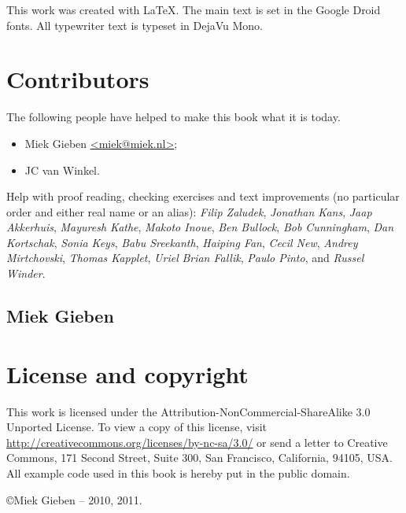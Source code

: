 \noindent{}This work was created with \LaTeX. The main text is set in
the Google Droid fonts. All typewriter text is typeset in DejaVu Mono.

\section{Contributors}
The following people have helped to make this book what it is today.
\begin{itemize}
\item{Miek Gieben \qquad\url{<miek@miek.nl>}};
\item{JC van Winkel}.
\end{itemize}

Help with proof reading, checking exercises and text improvements (no
particular order and either real name or an alias):
\emph{Filip Zaludek},
\emph{Jonathan Kans},
\emph{Jaap Akkerhuis},
\emph{Mayuresh Kathe},
\emph{Makoto Inoue},
\emph{Ben Bullock},
\emph{Bob Cunningham},
\emph{Dan Kortschak},
\emph{Sonia Keys},
\emph{Babu Sreekanth},
\emph{Haiping Fan},
\emph{Cecil New},
\emph{Andrey Mirtchovski},
\emph{Thomas Kapplet},
\emph{Uriel}
\emph{Brian Fallik},
\emph{Paulo Pinto},
and \emph{Russel Winder}.

\subsection{Miek Gieben}


\section{License and copyright}
This work is licensed under the Attribution-NonCommercial-ShareAlike 3.0 Unported License. To
view a copy of this license, visit \url{http://creativecommons.org/licenses/by-nc-sa/3.0/}
or send a letter to Creative Commons, 171 Second Street, Suite 300, San
Francisco, California, 94105, USA.\newline
All example code used in this book is hereby put in the public domain.

\copyright Miek Gieben -- 2010, 2011.
